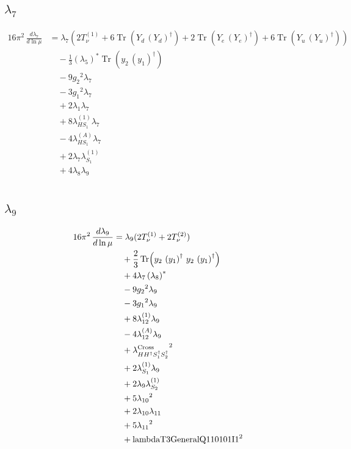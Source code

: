 \documentclass[10pt,a4paper]{article}
\begin{document}
\subsection*{$\lambda_{7}$}
\begin{align*}
16\pi^2\,\frac{d \lambda_{7}}{d\ln\mu} &={\lambda_{7}} (2 T_{\nu}^{(1)}+6 \operatorname{Tr}\!\left({Y_d}\,\left({Y_d}\right)^{\dagger}\right)+2 \operatorname{Tr}\!\left({Y_e}\,\left({Y_e}\right)^{\dagger}\right)+6 \operatorname{Tr}\!\left({Y_u}\,\left({Y_u}\right)^{\dagger}\right)) \\
&\quad -\frac{1}{3} \left({\lambda_5}\right)^{*} \operatorname{Tr}\!\left({y_2}\,\left({y_1}\right)^{\dagger}\right) \\
&\quad -9 {g_2}^2 {\lambda_{7}} \\
&\quad -3 {g_1}^2 {\lambda_{7}} \\
&\quad +2 {\lambda_1} {\lambda_{7}} \\
&\quad +8 {\lambda_{HS_1}^{(1)}} {\lambda_{7}} \\
&\quad -4 {\lambda_{HS_1}^{(A)}} {\lambda_{7}} \\
&\quad +2 {\lambda_{7}} {\lambda_{S_1}^{(1)}} \\
&\quad +4 {\lambda_{8}} {\lambda_{9}} \\
\end{align*}
\subsection*{$\lambda_{9}$}
\begin{align*}
16\pi^2\,\frac{d \lambda_{9}}{d\ln\mu} &={\lambda_{9}} (2 T_{\nu}^{(1)}+2 T_{\nu}^{(2)}) \\
&\quad +\frac{2}{3} \operatorname{Tr}\!\left({y_2}\,\left({y_1}\right)^{\dagger}\,{y_2}\,\left({y_1}\right)^{\dagger}\right) \\
&\quad +4 {\lambda_{7}} \left({\lambda_{8}}\right)^{*} \\
&\quad -9 {g_2}^2 {\lambda_{9}} \\
&\quad -3 {g_1}^2 {\lambda_{9}} \\
&\quad +8 {\lambda_{12}^{(1)}} {\lambda_{9}} \\
&\quad -4 {\lambda_{12}^{(A)}} {\lambda_{9}} \\
&\quad +{\lambda_{H H^\dagger S_1^\dagger S_2^\dagger}^{\rm Cross}}^2 \\
&\quad +2 {\lambda_{S_1}^{(1)}} {\lambda_{9}} \\
&\quad +2 {\lambda_{9}} {\lambda_{S_2}^{(1)}} \\
&\quad +5 {\lambda_{10}}^2 \\
&\quad +2 {\lambda_{10}} {\lambda_{11}} \\
&\quad +5 {\lambda_{11}}^2 \\
&\quad +\text{lambdaT3GeneralQ110101I1}^2 \\
\end{align*}
\end{document}
